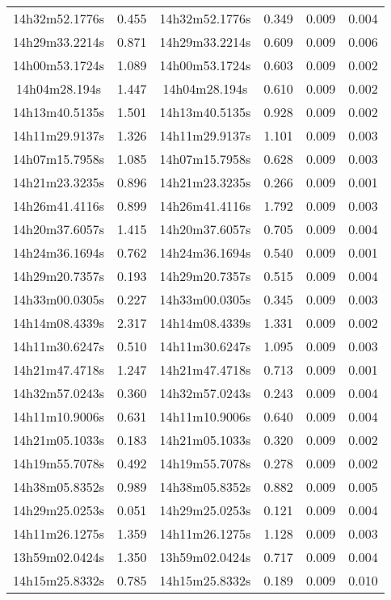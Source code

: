 \begin{table}
\begin{tabular}{cccccc}
14h32m52.1776s & 0.455 & 14h32m52.1776s & 0.349 & 0.009 & 0.004 \\
14h29m33.2214s & 0.871 & 14h29m33.2214s & 0.609 & 0.009 & 0.006 \\
14h00m53.1724s & 1.089 & 14h00m53.1724s & 0.603 & 0.009 & 0.002 \\
14h04m28.194s & 1.447 & 14h04m28.194s & 0.610 & 0.009 & 0.002 \\
14h13m40.5135s & 1.501 & 14h13m40.5135s & 0.928 & 0.009 & 0.002 \\
14h11m29.9137s & 1.326 & 14h11m29.9137s & 1.101 & 0.009 & 0.003 \\
14h07m15.7958s & 1.085 & 14h07m15.7958s & 0.628 & 0.009 & 0.003 \\
14h21m23.3235s & 0.896 & 14h21m23.3235s & 0.266 & 0.009 & 0.001 \\
14h26m41.4116s & 0.899 & 14h26m41.4116s & 1.792 & 0.009 & 0.003 \\
14h20m37.6057s & 1.415 & 14h20m37.6057s & 0.705 & 0.009 & 0.004 \\
14h24m36.1694s & 0.762 & 14h24m36.1694s & 0.540 & 0.009 & 0.001 \\
14h29m20.7357s & 0.193 & 14h29m20.7357s & 0.515 & 0.009 & 0.004 \\
14h33m00.0305s & 0.227 & 14h33m00.0305s & 0.345 & 0.009 & 0.003 \\
14h14m08.4339s & 2.317 & 14h14m08.4339s & 1.331 & 0.009 & 0.002 \\
14h11m30.6247s & 0.510 & 14h11m30.6247s & 1.095 & 0.009 & 0.003 \\
14h21m47.4718s & 1.247 & 14h21m47.4718s & 0.713 & 0.009 & 0.001 \\
14h32m57.0243s & 0.360 & 14h32m57.0243s & 0.243 & 0.009 & 0.004 \\
14h11m10.9006s & 0.631 & 14h11m10.9006s & 0.640 & 0.009 & 0.004 \\
14h21m05.1033s & 0.183 & 14h21m05.1033s & 0.320 & 0.009 & 0.002 \\
14h19m55.7078s & 0.492 & 14h19m55.7078s & 0.278 & 0.009 & 0.002 \\
14h38m05.8352s & 0.989 & 14h38m05.8352s & 0.882 & 0.009 & 0.005 \\
14h29m25.0253s & 0.051 & 14h29m25.0253s & 0.121 & 0.009 & 0.004 \\
14h11m26.1275s & 1.359 & 14h11m26.1275s & 1.128 & 0.009 & 0.003 \\
13h59m02.0424s & 1.350 & 13h59m02.0424s & 0.717 & 0.009 & 0.004 \\
14h15m25.8332s & 0.785 & 14h15m25.8332s & 0.189 & 0.009 & 0.010 \\

\end{tabular}
\end{table}
